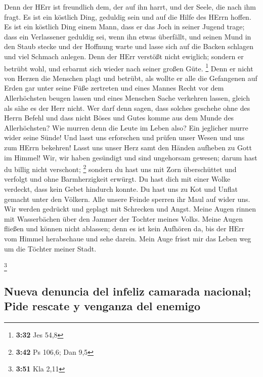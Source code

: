  Denn der HErr ist freundlich dem, der auf ihn harrt, und
der Seele, die nach ihm fragt.  Es ist ein köstlich Ding,
geduldig sein und auf die Hilfe des HErrn hoffen.  Es ist
ein köstlich Ding einem Mann, dass er das Joch in seiner Jugend trage;
 dass ein Verlassener geduldig sei, wenn ihn etwas
überfällt,  und seinen Mund in den Staub stecke und der
Hoffnung warte  und lasse sich auf die Backen schlagen
und viel Schmach anlegen.  Denn der HErr verstößt nicht
ewiglich;  sondern er betrübt wohl, und erbarmt sich
wieder nach seiner großen Güte. \footnote{\textbf{3:32} Jes 54,8}
 Denn er nicht von Herzen die Menschen plagt und betrübt,
 als wollte er alle die Gefangenen auf Erden gar unter
seine Füße zertreten  und eines Mannes Recht vor dem
Allerhöchsten beugen lassen  und eines Menschen Sache
verkehren lassen, gleich als sähe es der Herr nicht.  Wer
darf denn sagen, dass solches geschehe ohne des Herrn Befehl
 und dass nicht Böses und Gutes komme aus dem Munde des
Allerhöchsten?  Wie murren denn die Leute im Leben also?
Ein jeglicher murre wider seine Sünde!  Und lasst uns
erforschen und prüfen unser Wesen und uns zum HErrn bekehren!
 Lasst uns unser Herz samt den Händen aufheben zu Gott im
Himmel!  Wir, wir haben gesündigt und sind ungehorsam
gewesen; darum hast du billig nicht verschont; \footnote{\textbf{3:42}
  Ps 106,6; Dan 9,5}  sondern du hast uns mit Zorn
überschüttet und verfolgt und ohne Barmherzigkeit erwürgt.
 Du hast dich mit einer Wolke verdeckt, dass kein Gebet
hindurch konnte.  Du hast uns zu Kot und Unflat gemacht
unter den Völkern.  Alle unsere Feinde sperren ihr Maul
auf wider uns.  Wir werden gedrückt und geplagt mit
Schrecken und Angst.  Meine Augen rinnen mit Wasserbächen
über den Jammer der Tochter meines Volks.  Meine Augen
fließen und können nicht ablassen; denn es ist kein Aufhören da,
 bis der HErr vom Himmel herabschaue und sehe darein.
 Mein Auge frisst mir das Leben weg um die Töchter meiner
Stadt.

\footnote{\textbf{3:51} Kla 2,11}

\hypertarget{nueva-denuncia-del-infeliz-camarada-nacional-pide-rescate-y-venganza-del-enemigo}{%
\subsection{Nueva denuncia del infeliz camarada nacional; Pide rescate y
venganza del
enemigo}\label{nueva-denuncia-del-infeliz-camarada-nacional-pide-rescate-y-venganza-del-enemigo}}

